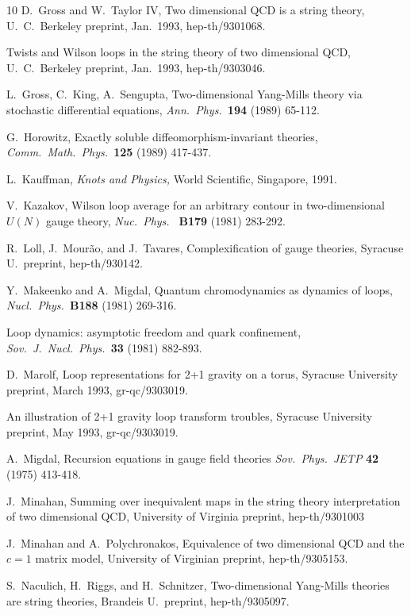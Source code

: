 \documentclass[12pt]{article}
\begin{document}
\begin{thebibliography} {10}
 D.\ Gross and W.\ Taylor IV, Two dimensional QCD is a
string theory, U.\ C.\ Berkeley preprint, Jan.\ 1993, hep-th/9301068.

Twists and Wilson loops in
the string theory of two dimensional QCD, U.\ C.\ Berkeley preprint,
Jan.\ 1993, hep-th/9303046.

 L.\ Gross, C.\ King, A.\ Sengupta, Two-dimensional
Yang-Mills theory via stochastic differential equations, {\sl Ann.\
Phys.\ }{\bf 194} (1989) 65-112.

 G.\ Horowitz, Exactly soluble diffeomorphism-invariant
theories, {\sl Comm.\ Math.\ Phys.\ }{\bf 125} (1989) 417-437.

  L.\ Kauffman, {\sl Knots and Physics,} World
Scientific, Singapore, 1991.

 V.\ Kazakov, Wilson loop average for an arbitrary
contour in two-dimensional $U(N)$ gauge theory, {\sl Nuc.\ Phys.\ }{\bf
B179} (1981) 283-292.

 R.\ Loll, J.\ Mour\~ao, and J.\ Tavares,
Complexification of gauge theories, Syracuse U.\ preprint,
hep-th/930142.

 Y.\ Makeenko and A.\ Migdal, Quantum chromodynamics as
dynamics of loops, {\sl Nucl.\ Phys.\ }{\bf B188} (1981) 269-316.

Loop dynamics: asymptotic
freedom and quark confinement, {\sl Sov.\ J.\ Nucl.\ Phys.\ }{\bf 33} (1981)
882-893.

 D.\ Marolf, Loop representations for 2+1 gravity
 on a torus, Syracuse University preprint, March 1993, gr-qc/9303019.

An illustration of 2+1 gravity loop transform troubles,
Syracuse University preprint, May 1993, gr-qc/9303019.

  A.\  Migdal, Recursion equations in gauge field
theories {\sl Sov.\ Phys.\  JETP} {\bf 42} (1975) 413-418.

 J.\ Minahan, Summing over inequivalent maps in the
string theory interpretation of two dimensional QCD, University of
Virginia preprint, hep-th/9301003

 J.\ Minahan and A.\ Polychronakos, Equivalence of two
dimensional QCD and the $c = 1$ matrix model, University of Virginian
preprint, hep-th/9305153.

 S.\ Naculich, H.\ Riggs, and H.\ Schnitzer,
Two-dimensional Yang-Mills theories are string theories, Brandeis U.\
preprint, hep-th/9305097.


\end{thebibliography}
\end{document}
